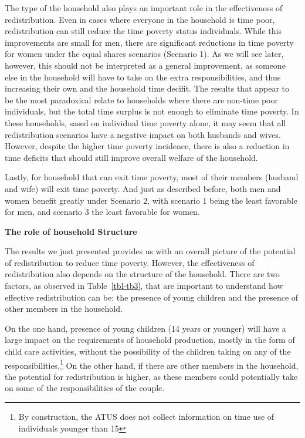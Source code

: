 \documentclass[
  11pt,
]{article}
\begin{document}
The type of the household also plays an important role in the
effectiveness of redistribution. Even in cases where everyone in the
household is time poor, redistribution can still reduce the time poverty
status individuals. While this improvements are small for men, there are
significant reductions in time poverty for women under the equal shares
scenarios (Scenario 1). As we will see later, however, this should not
be interpreted as a general improvement, as someone else in the
household will have to take on the extra responsibilities, and thus
increasing their own and the household time decifit. The results that
appear to be the most paradoxical relate to households where there are
non-time poor individuals, but the total time surplus is not enough to
eliminate time poverty. In these households, sased on individual time
poverty alone, it may seem that all redistribution scenarios have a
negative impact on both husbands and wives. However, despite the higher
time poverty incidence, there is also a reduction in time deficits that
should still improve overall welfare of the household.

Lastly, for household that can exit time poverty, most of their members
(husband and wife) will exit time poverty. And just as described before,
both men and women benefit greatly under Scenario 2, with scenario 1
being the least favorable for men, and scenario 3 the least favorable
for women.

\textbf{The role of household Structure}

The results we just presented provides us with an overall picture of the
potential of redistribution to reduce time poverty. However, the
effectiveness of redistribution also depends on the structure of the
household. There are two factors, as observed in Table~\ref{tbl-tb3},
that are important to understand how effective redistribution can be:
the presence of young children and the presence of other members in the
household.

On the one hand, presence of young children (14 years or younger) will
have a large impact on the requirements of household production, mostly
in the form of child care activities, without the possibility of the
children taking on any of the responsibilities.\footnote{By
  construction, the ATUS does not collect information on time use of
  individuals younger than 15} On the other hand, if there are other
members in the household, the potential for redistribution is higher, as
these members could potentially take on some of the responsibilities of
the couple.
\end{document}
